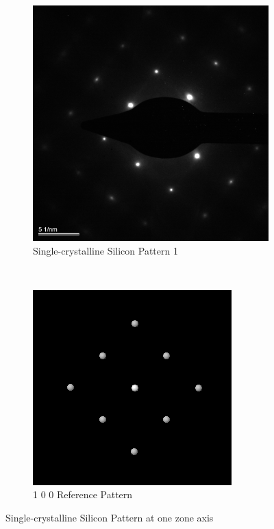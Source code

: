 \documentclass[12pt,a4paper]{article}
\begin{document}
\begin{figure}[htbp]
  \centering
  \begin{subfigure}[b]{0.45\textwidth}
    \includegraphics[width=\textwidth]{data/Image3 Si_Diff_Zone1.png}
    \caption{Single-crystalline Silicon Pattern 1}
    \label{fig:si1}
  \end{subfigure}%
  ~
  \begin{subfigure}[b]{0.45\textwidth}
    \includegraphics[width=\textwidth]{data/100.png}
    \caption{1 0 0 Reference Pattern}
    \label{fig:100}
  \end{subfigure}%
  \caption{Single-crystalline Silicon Pattern at one zone axis}
  \label{fig:zone1}
\end{figure}
\end{document}
